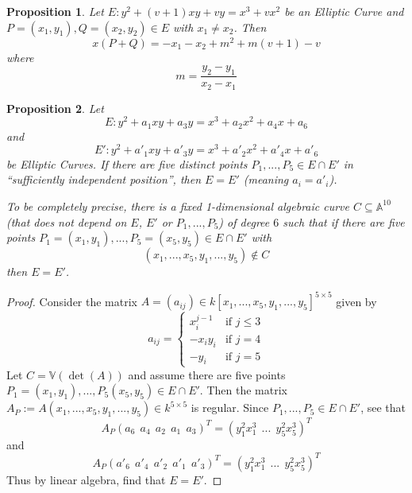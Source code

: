 \documentclass{scrartcl}
\newcommand{\V}{\mathbb{V}}
\newtheorem{prop}{Proposition}
\theoremstyle{definition}
\begin{document}
\begin{prop}
    Let $E: y^2 + (v + 1) x y + v y = x^3 + v x^2$ be an Elliptic Curve and $P = (x_1, y_1), Q = (x_2, y_2) \in E$ with $x_1 \neq x_2$.
    Then
    \begin{equation*}
        x(P + Q) = -x_1 - x_2 + m^2 + m(v + 1) - v
    \end{equation*}
    where
    \begin{equation*}
        m = \frac {y_2 - y_1} {x_2 - x_1}
    \end{equation*}
\end{prop}
\begin{prop}
    Let
    \begin{equation*}
        E: y^2 + a_1 x y + a_3 y = x^3 + a_2 x^2 + a_4 x + a_6    
    \end{equation*}
    and
    \begin{equation*}
        E': y^2 + a'_1 x y + a'_3 y = x^3 + a'_2 x^2 + a'_4 x + a'_6    
    \end{equation*}
    be Elliptic Curves.
    If there are five distinct points $P_1, ..., P_5 \in E \cap E'$ in ``sufficiently independent position'', then $E = E'$ (meaning $a_i = a'_i$).

    To be completely precise, there is a fixed 1-dimensional algebraic curve $C \subseteq \mathbb{A}^{10}$ (that does not depend on $E$, $E'$ or $P_1, ..., P_5$) of degree $6$ such that if there are five points $P_1 = (x_1, y_1), ..., P_5 = (x_5, y_5) \in E \cap E'$ with
    \begin{equation*}
        (x_1, ..., x_5, y_1, ..., y_5) \notin C
    \end{equation*}
    then $E = E'$.
\end{prop}
\begin{proof}
    Consider the matrix $A = (a_{ij}) \in k[x_1, ..., x_5, y_1, ..., y_5]^{5 \times 5}$ given by
    \begin{equation*}
        a_{ij} = \begin{cases}
            x_i^{j - 1} & \text{if $j \leq 3$} \\
            -x_iy_i & \text{if $j = 4$} \\
            -y_i & \text{if $j = 5$}
        \end{cases}
    \end{equation*}
    Let $C = \V(\det(A))$ and assume there are five points $P_1 = (x_1, y_1), ..., P_5(x_5, y_5) \in E \cap E'$.
    Then the matrix $A_P := A(x_1, ..., x_5, y_1, ..., y_5) \in k^{5 \times 5}$ is regular.
    Since $P_1, ..., P_5 \in E \cap E'$, see that
    \begin{equation*}
        A_P (a_6 \ \ a_4 \ \ a_2 \ \ a_1 \ \ a_3)^T = (y_1^2 x_1^3 \ \ ... \ \ y_5^2 x_5^3)^T
    \end{equation*}
    and
    \begin{equation*}
        A_P (a'_6 \ \ a'_4 \ \ a'_2 \ \ a'_1 \ \ a'_3)^T = (y_1^2 x_1^3 \ \ ... \ \ y_5^2 x_5^3)^T
    \end{equation*}
    Thus by linear algebra, find that $E = E'$.
\end{proof}
\end{document}
